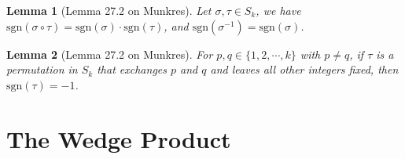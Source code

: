 \documentclass[11pt,oneside]{book}
\theoremstyle{break}
\theoremstyle{break}
\newtheorem{lem}{Lemma}[thm]
\newcommand{\sgn}{\text{sgn}}
\begin{document}
\begin{lem}[Lemma 27.2 on Munkres]
Let $\sigma ,\tau \in S_k$, we have $\sgn(\sigma\circ \tau) = \sgn(\sigma) \cdot \sgn(\tau)$, and $\sgn(\sigma^{-1}) = \sgn(\sigma)$. 
\end{lem}

\begin{lem}[Lemma 27.2 on Munkres]
For $p,q \in \{1,2,\cdots, k\}$ with $p \neq q$, if $\tau$ is a permutation in $S_k$ that exchanges $p$ and $q$ and leaves all other integers fixed, then $\sgn(\tau) = -1$. 
\end{lem}


\newpage
\section[The Wedge Product]{\color{red}The Wedge Product\color{black}}
\end{document}

